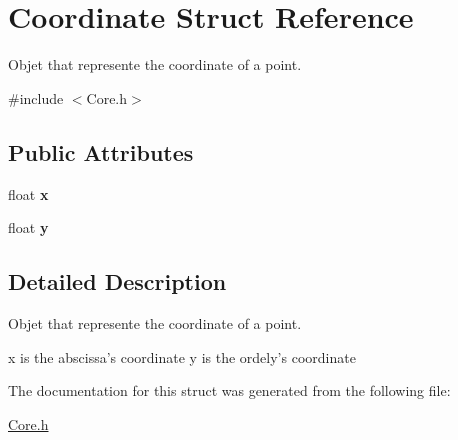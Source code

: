 \hypertarget{structCoordinate}{\section{Coordinate Struct Reference}
\label{structCoordinate}
}


Objet that represente the coordinate of a point.  




{\ttfamily \#include $<$Core.\-h$>$}

\subsection*{Public Attributes}
\begin{DoxyCompactItemize}
\item 
\hypertarget{structCoordinate_a514c8968b1d03f65e76c9cc9566ee4cc}{float {\bfseries x}}\label{structCoordinate_a514c8968b1d03f65e76c9cc9566ee4cc}

\item 
\hypertarget{structCoordinate_a1a7d11305e68c5bfba2b9d4569d4b6ef}{float {\bfseries y}}\label{structCoordinate_a1a7d11305e68c5bfba2b9d4569d4b6ef}

\end{DoxyCompactItemize}


\subsection{Detailed Description}
Objet that represente the coordinate of a point. 

x is the abscissa's coordinate y is the ordely's coordinate 

The documentation for this struct was generated from the following file\-:\begin{DoxyCompactItemize}
\item 
\hyperlink{Core_8h}{Core.\-h}\end{DoxyCompactItemize}
